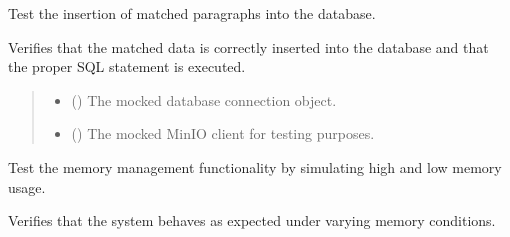 \documentclass[letterpaper,10pt,english]{sphinxmanual}
\begin{document}
\begin{fulllineitems}
\label{\detokenize{test.data_storage:test.data_storage.test_paragraph_extraction.test_insert_matched_data}}
\pysigstartsignatures
\pysiglinewithargsret
{}
{\sphinxparamcomma {}}
{}
\pysigstopsignatures
\sphinxAtStartPar
Test the insertion of matched paragraphs into the database.

\sphinxAtStartPar
Verifies that the matched data is correctly inserted into the database and that the
proper SQL statement is executed.
\begin{quote}\begin{description}
\begin{itemize}
\item {} 
\sphinxAtStartPar
{} () \textendash{} The mocked database connection object.

\item {} 
\sphinxAtStartPar
{} () \textendash{} The mocked MinIO client for testing purposes.

\end{itemize}

\end{description}\end{quote}

\end{fulllineitems}


\begin{fulllineitems}
\label{\detokenize{test.data_storage:test.data_storage.test_paragraph_extraction.test_memory_management}}
\pysigstartsignatures
\pysiglinewithargsret
{}
{}
{}
\pysigstopsignatures
\sphinxAtStartPar
Test the memory management functionality by simulating high and low memory usage.

\sphinxAtStartPar
Verifies that the system behaves as expected under varying memory conditions.

\end{fulllineitems}
\end{document}

